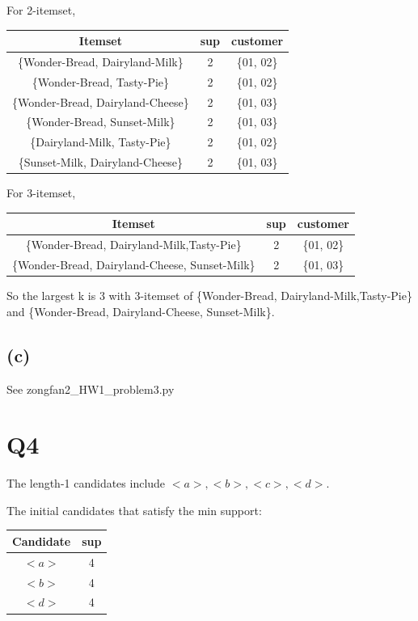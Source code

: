 \documentclass[]{article}
\begin{document}
For 2-itemset,\\
\begin{table}[!ht]
    \begin{tabular}{c c c}
        \hline 
        \textbf{Itemset} & \textbf{sup} & \textbf{customer}\\
        \hline
        \{Wonder-Bread, Dairyland-Milk\} & 2 & \{01, 02\} \\
        \{Wonder-Bread, Tasty-Pie\} & 2 & \{01, 02\} \\
        \{Wonder-Bread, Dairyland-Cheese\} & 2 & \{01, 03\} \\
        \{Wonder-Bread, Sunset-Milk\} & 2 & \{01, 03\} \\
        \{Dairyland-Milk, Tasty-Pie\} & 2 & \{01, 02\} \\
        \{Sunset-Milk, Dairyland-Cheese\} & 2 & \{01, 03\}\\
        \hline
    \end{tabular}
\end{table}

For 3-itemset, \\
\begin{table}[!ht]
    \begin{tabular}{c c c}
        \hline 
        \textbf{Itemset} & \textbf{sup} & \textbf{customer}\\
        \hline
        \{Wonder-Bread, Dairyland-Milk,Tasty-Pie\} & 2 & \{01, 02\} \\
        \{Wonder-Bread, Dairyland-Cheese, Sunset-Milk\} & 2 & \{01, 03\} \\
        \hline
    \end{tabular}
\end{table}

So the largest k is 3 with 3-itemset of \{Wonder-Bread, Dairyland-Milk,Tasty-Pie\} and \{Wonder-Bread, Dairyland-Cheese, Sunset-Milk\}.  

\subsection*{(c)}
See zongfan2\_HW1\_problem3.py

\newpage

\section*{Q4}
The length-1 candidates include $<a>, <b>, <c>, <d>$.

The initial candidates that satisfy the min support: \\
\begin{table}[!ht]
    \begin{tabular}{c c }
        \hline 
        \textbf{Candidate} & \textbf{sup} \\
        \hline
        $<a>$ & 4 \\
        $<b>$ & 4 \\
        $<d>$ & 4 \\
        \hline
    \end{tabular}
\end{table}
\end{document}

